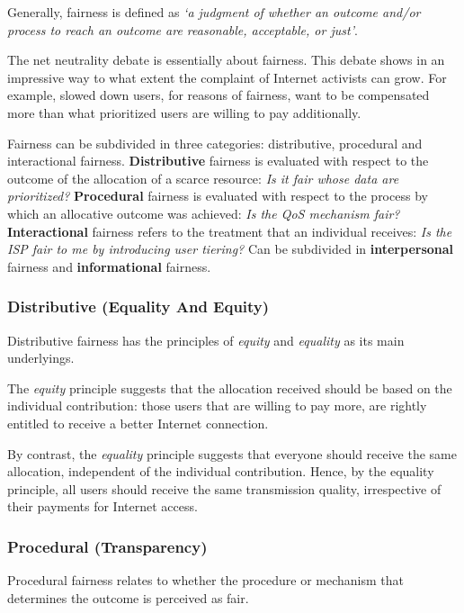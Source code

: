 
Generally, fairness is defined as \emph{`a judgment of whether an outcome and/or process to reach an outcome are reasonable, acceptable, or just'}.

The net neutrality debate is essentially about fairness. This debate shows in an impressive way to what extent the complaint of Internet activists can grow. For example, slowed down users, for reasons of fairness, want to be compensated more than what prioritized users are willing to pay additionally.

Fairness can be subdivided in three categories: distributive, procedural and interactional fairness. \textbf{Distributive} fairness is evaluated with respect to the outcome of the allocation of a scarce resource: \emph{Is it fair whose data are prioritized?} \textbf{Procedural} fairness is evaluated with respect to the process by which an allocative outcome was achieved: \emph{Is the QoS mechanism fair?} \textbf{Interactional} fairness refers to the treatment that an individual receives: \emph{Is the ISP fair to me by introducing user tiering?} Can be subdivided in \textbf{interpersonal} fairness and \textbf{informational} fairness.

\subsubsection{Distributive (Equality And Equity)}
Distributive fairness has the principles of \emph{equity} and \emph{equality} as its main underlyings.

The \emph{equity} principle suggests that the allocation received should be based on the individual contribution: those users that are willing to pay more, are rightly entitled to receive a better Internet connection.

By contrast, the \emph{equality} principle suggests that everyone should receive the same allocation, independent of the individual contribution. Hence, by the equality principle, all users should receive the same transmission quality, irrespective of their payments for Internet access.

\subsubsection{Procedural (Transparency)}
Procedural fairness relates to whether the procedure or mechanism that determines the outcome is perceived as fair.

